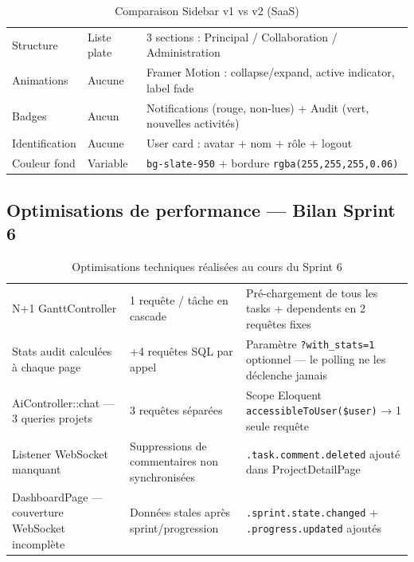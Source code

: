 \begin{table}[H]
  \centering
  \caption{Comparaison Sidebar v1 vs v2 (SaaS)}
  \label{tab:sidebar_compare}
  \begin{tabularx}{\textwidth}{L{3.5cm}L{4cm}X}
    \toprule
     &  &  \\
    \midrule
    Structure       & Liste plate         & 3 sections : Principal / Collaboration / Administration \\
    Animations      & Aucune              & Framer Motion : collapse/expand, active indicator, label fade \\
    Badges          & Aucun               & Notifications (rouge, non-lues) + Audit (vert, nouvelles activités) \\
    Identification  & Aucune              & User card : avatar + nom + rôle + logout \\
    Couleur fond    & Variable            & \texttt{bg-slate-950} + bordure \texttt{rgba(255,255,255,0.06)} \\
    \bottomrule
  \end{tabularx}
\end{table}

\subsection{Optimisations de performance — Bilan Sprint 6}

\begin{table}[H]
  \centering
  \caption{Optimisations techniques réalisées au cours du Sprint 6}
  \label{tab:perf_s6}
  \begin{tabularx}{\textwidth}{L{4.5cm}L{3cm}X}
    \toprule
     &  &  \\
    \midrule
    N+1 GanttController & 1 requête / tâche en cascade &
      Pré-chargement de tous les tasks + dependents en 2 requêtes fixes \\
    Stats audit calculées à chaque page &
      +4 requêtes SQL par appel &
      Paramètre \texttt{?with\_stats=1} optionnel — le polling ne les déclenche jamais \\
    AiController::chat — 3 queries projets &
      3 requêtes séparées &
      Scope Eloquent \texttt{accessibleToUser(\$user)} → 1 seule requête \\
    Listener WebSocket manquant &
      Suppressions de commentaires non synchronisées &
      \texttt{.task.comment.deleted} ajouté dans ProjectDetailPage \\
    DashboardPage — couverture WebSocket incomplète &
      Données stales après sprint/progression &
      \texttt{.sprint.state.changed} + \texttt{.progress.updated} ajoutés \\
    \bottomrule
  \end{tabularx}
\end{table}

